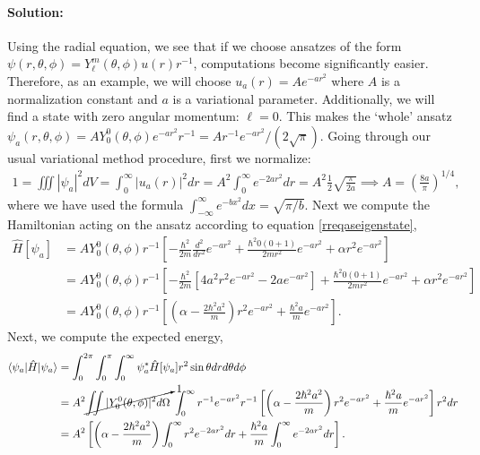 \documentclass[10pt]{article}
\newcommand{\1}{\mathbf 1}
\begin{document}
\paragraph{Solution:}

Using the radial equation, we see that if we choose ansatzes of the form $\psi(r,\theta,\phi) = Y_\ell^m (\theta,\phi) u(r) r^{-1}$, computations become significantly easier.
Therefore, as an example, we will choose $u_a(r) = Ae^{-ar^2}$ where $A$ is a normalization constant and $a$ is a variational parameter.
Additionally, we will find a state with zero angular momentum: $\ell = 0$.
This makes the `whole' ansatz $\psi_a (r,\theta,\phi)= A Y_0^0(\theta,\phi) e^{-ar^2} r^{-1}
=
A r^{-1}e^{-ar^2}/(2 \sqrt{\pi})
$.
Going through our usual variational method procedure, first we normalize:
\begin{align}
	1 = \iiint |\psi_a|^2 dV
	=
	\int_0^\infty |u_a(r)|^2 dr
	=
	A^2 \int_0^\infty e^{-2ar^2} dr
	=
	A^2 \frac{1}{2} \sqrt{\frac{\pi}{2a}}
	\implies
	A
	=
	\left(\frac{8a}{\pi}\right)^{1/4},
\end{align}
where we have used the formula $\int_{-\infty}^\infty e^{-b x^2} dx = \sqrt{\pi/b}$.
Next we compute the Hamiltonian acting on the ansatz according to equation \ref{rreqaseigenstate},
\begin{align}
	\hat H [\psi_a]
	\nonumber
	&=
	A Y_0^0(\theta,\phi)
	r^{-1}
	\left[
		-\frac{\hbar^2}{2 m}
		\frac{d^2}{dr^2}
		e^{-ar^2}
		+
		\frac{\hbar^2 0 (0+1)}{2 m r^2}
		e^{-ar^2}
		+
		\alpha r^2 e^{-ar^2}
	\right]\\
	&
	=
	A Y_0^0(\theta,\phi)
	r^{-1}
	\left[
		-\frac{\hbar^2}{2 m}
		\left[
			4 a^2 r^2 e^{-a r^2}-2 a e^{-a r^2}
		\right]
		+
		\frac{\hbar^2 0 (0+1)}{2 m r^2}
		e^{-ar^2}
		+
		\alpha r^2 e^{-ar^2}
	\right]
	\nonumber
	\\
	&=
	A Y_0^0 (\theta,\phi)r^{-1}
	\left[
	\left(
		\alpha-\frac{2\hbar^2a^2}{m} 
	\right)r^2 e^{-ar^2}
	+
	\frac{\hbar^2 a}{m}
	e^{-ar^2}
	\right].
\end{align}
Next, we compute the expected energy,
\begin{align}
	\braket{\psi_a | \hat H | \psi_a}
	&=\nonumber
	\int_0^{2\pi}
	\int_0^{\pi}
	\int_0^\infty 
	\psi_a^\ast \hat H[\psi_a]
	r^2 \sin\theta dr
	d\theta
	d\phi
	\\
	&=
	A^2
	\cancelto{1}{\iint|Y_0^0 (\theta,\phi)|^2d\Omega}\;
	\int_0^\infty r^{-1}e^{-a r^2}r^{-1}
	\left[
	\left(
		\alpha-\frac{2\hbar^2a^2}{m} 
	\right)r^2 e^{-ar^2}
	+
	\frac{\hbar^2 a}{m}
	e^{-ar^2}
	\right]
	r^2
	dr
	\nonumber
	\\
	&=
	A^2 
	\left[
	\left(
		\alpha-\frac{2\hbar^2a^2}{m} 
	\right)
	\int_0^\infty 
	r^2 e^{-2ar^2}
	dr
	+
	\frac{\hbar^2 a}{m}
	\int_0^\infty 
	e^{-2ar^2}
	dr
	\right].
	\nonumber
\end{align}
\end{document}
